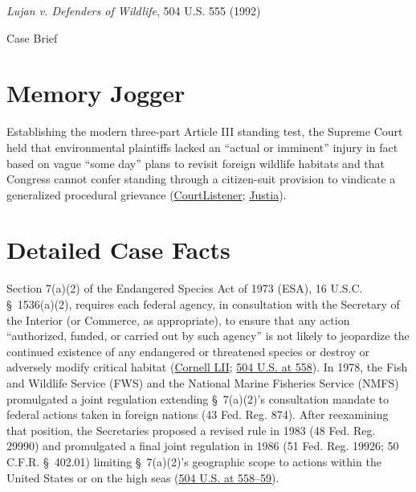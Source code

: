 \documentclass[12pt]{article}
\begin{document}
\begin{center}
{\LARGE \textit{Lujan v. Defenders of Wildlife}, 504 U.S. 555 (1992)\par}
\vspace{0.8em}
{\large Case Brief\par}
\end{center}
\vspace{1em}

\section{Memory Jogger}
Establishing the modern three-part Article III standing test, the Supreme Court held that environmental plaintiffs lacked an ``actual or imminent'' injury in fact based on vague ``some day'' plans to revisit foreign wildlife habitats and that Congress cannot confer standing through a citizen-suit provision to vindicate a generalized procedural grievance (\href{https://www.courtlistener.com/opinion/112747/lujan-v-defenders-of-wildlife/}{CourtListener}; \href{https://supreme.justia.com/cases/federal/us/504/555/}{Justia}).

\section{Detailed Case Facts}
Section 7(a)(2) of the Endangered Species Act of 1973 (ESA), 16 U.S.C. \S~1536(a)(2), requires each federal agency, in consultation with the Secretary of the Interior (or Commerce, as appropriate), to ensure that any action ``authorized, funded, or carried out by such agency'' is not likely to jeopardize the continued existence of any endangered or threatened species or destroy or adversely modify critical habitat (\href{https://www.law.cornell.edu/supct/html/90-1424.ZO.html}{Cornell LII}; \href{https://supreme.justia.com/cases/federal/us/504/555/}{504 U.S. at 558}). In 1978, the Fish and Wildlife Service (FWS) and the National Marine Fisheries Service (NMFS) promulgated a joint regulation extending \S~7(a)(2)'s consultation mandate to federal actions taken in foreign nations (43 Fed. Reg. 874). After reexamining that position, the Secretaries proposed a revised rule in 1983 (48 Fed. Reg. 29990) and promulgated a final joint regulation in 1986 (51 Fed. Reg. 19926; 50 C.F.R. \S~402.01) limiting \S~7(a)(2)'s geographic scope to actions within the United States or on the high seas (\href{https://supreme.justia.com/cases/federal/us/504/555/}{504 U.S. at 558--59}).
\end{document}
